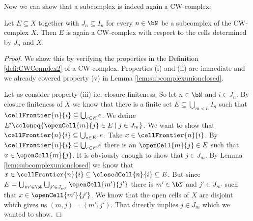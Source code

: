Now we can show that a subcomplex is indeed again a CW-complex: 

\begin{lem}
    Let $E \subseteq X$ together with $J_n \subseteq I_n$ for every $n \in \bN$ be a subcomplex of the CW-complex $X$. 
    Then $E$ is again a CW-complex with respect to the cells determined by $J_n$ and $X$.
\end{lem}
\begin{proof}
    We show this by verifying the properties in the Definition \ref{defi:CWComplex2} of a CW-complex. 
    Properties (i) and (ii) are immediate and we already covered property (v) in Lemma \ref{lem:subcomplexunionclosed}.

    Let us consider property (iii) i.e. closure finiteness. 
    So let $n \in \bN$ and $i \in J_n$. 
    By closure finiteness of $X$ we know that there is a finite set $E \subseteq \bigcup_{m < n} I_n$ such that $\cellFrontier{n}{i} \subseteq \bigcup_{e \in E}e$. 
    We define $E' \coloneq \{\openCell{m}{j} \in E \mid j \in J_m\}$. 
    We want to show that $\cellFrontier{n}{i} \subseteq \bigcup_{e \in E'}e$. 
    Take $x \in \cellFrontier{n}{i}$. 
    By $\cellFrontier{n}{i} \subseteq \bigcup_{e \in E}e$ there is an $\openCell{m}{j} \in E$ such that $x \in \openCell{m}{j}$. 
    It is obviously enough to show that $j \in J_m$. 
    By Lemma \ref{lem:subcomplexunionclosed} we know that $x \in \cellFrontier{n}{i} \subseteq \closedCell{n}{i} \subseteq E$.
    But since $E = \bigcup_{m' \in \bN} \bigcup_{j' \in J_{m'}} \openCell{m'}{j'}$ there is $m' \in \bN$ and $j' \in J_{m'}$ such that $x \in \openCell{m'}{j'}$. 
    We know that the open cells of $X$ are disjoint which gives us $(m, j) = (m', j')$. 
    That directly implies $j \in J_m$ which we wanted to show. 


\end{proof}
